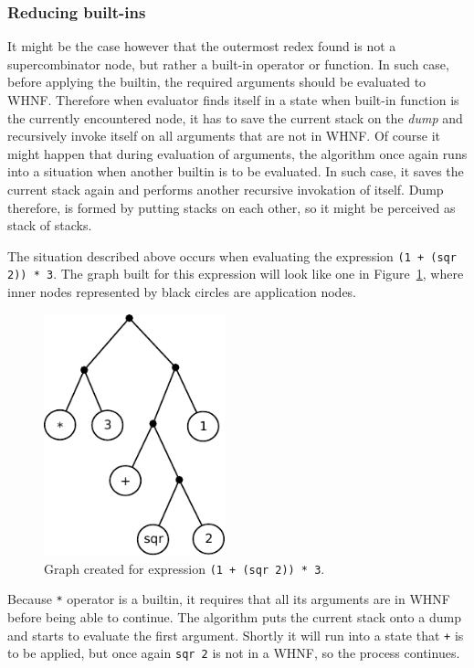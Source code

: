 \documentclass[12pt,a4paper]{report}
\begin{document}
\subsubsection{Reducing built-ins}
It might be the case however that the outermost redex found is not a
supercombinator node, but rather a built-in operator or function. In such case,
before applying the builtin, the required arguments should be evaluated to
WHNF. Therefore when evaluator finds itself in a state when built-in function
is the currently encountered node, it has to save the current stack on the
\textit{dump} and recursively invoke itself on all arguments that are not in
WHNF. Of course it might happen that during evaluation of arguments, the
algorithm once again runs into a situation when another builtin is to be
evaluated. In such case, it saves the current stack again and performs another
recursive invokation of itself. Dump therefore, is formed by putting stacks on
each other, so it might be perceived as stack of stacks.

The situation described above occurs when evaluating the expression \texttt{(1
+ (sqr 2)) * 3}. The graph built for this expression will look like one in
Figure~\ref{fig:expression_graph}, where inner nodes represented by black
circles are application nodes.

\vspace*{0.2in}
\begin{figure}[h!]
  \centering
  \includegraphics[height=7cm]{gmachine_graph}
  \caption{Graph created for expression \texttt{(1 + (sqr 2)) * 3}.}
  \label{fig:expression_graph}
\end{figure}

Because \texttt{*} operator is a builtin, it requires that all its arguments
are in WHNF before being able to continue. The algorithm puts the current stack
onto a dump and starts to evaluate the first argument. Shortly it will run into
a state that \texttt{+} is to be applied, but once again \texttt{sqr 2} is not
in a WHNF, so the process continues.
\end{document}
